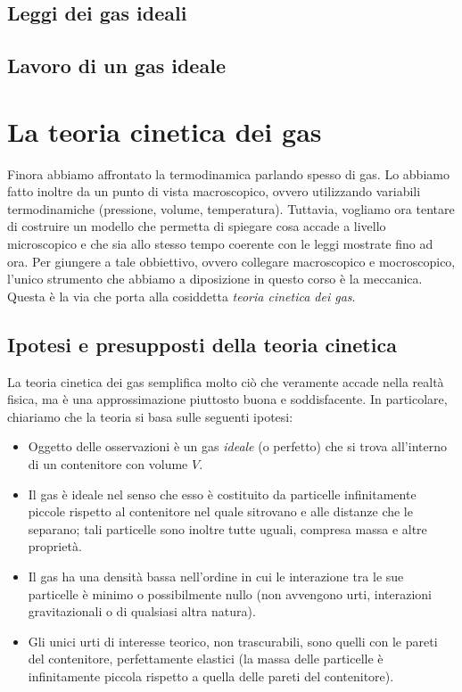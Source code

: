 \subsection{Leggi dei gas ideali}
\subsection{Lavoro di un gas ideale}

\section{La teoria cinetica dei gas}
Finora abbiamo affrontato la termodinamica parlando spesso di gas.
Lo abbiamo fatto inoltre da un punto di vista macroscopico, ovvero
utilizzando variabili termodinamiche (pressione, volume, temperatura).
Tuttavia, vogliamo ora tentare di costruire un modello che permetta
di spiegare cosa accade a livello microscopico e che sia allo stesso
tempo coerente con le leggi mostrate fino ad ora.
Per giungere a tale obbiettivo, ovvero collegare macroscopico e mocroscopico,
l'unico strumento che abbiamo a diposizione in questo corso è la meccanica.
Questa è la via che porta alla cosiddetta \textit{teoria cinetica dei
gas}.

\subsection*{Ipotesi e presupposti della teoria cinetica}
La teoria cinetica dei gas semplifica molto ciò che veramente accade
nella realtà fisica, ma è una approssimazione piuttosto buona e
soddisfacente. In particolare, chiariamo che la teoria si basa sulle
seguenti ipotesi:
\begin{itemize}
    \item Oggetto delle osservazioni è un gas \textit{ideale} (o
    perfetto) che si trova all'interno di un contenitore con volume
    $V$.

    \item Il gas è ideale nel senso che esso è costituito da
    particelle infinitamente piccole rispetto al contenitore nel
    quale sitrovano e alle distanze che le separano; tali particelle
    sono inoltre tutte uguali, compresa massa e altre proprietà.

    \item Il gas ha una densità bassa nell'ordine in cui le interazione
    tra le sue particelle è minimo o possibilmente nullo (non avvengono
    urti, interazioni gravitazionali o di qualsiasi altra natura).

    \item Gli unici urti di interesse teorico, non trascurabili, sono
    quelli con le pareti del contenitore, perfettamente elastici (la
    massa delle particelle è infinitamente piccola rispetto a quella
    delle pareti del contenitore).
\end{itemize}

